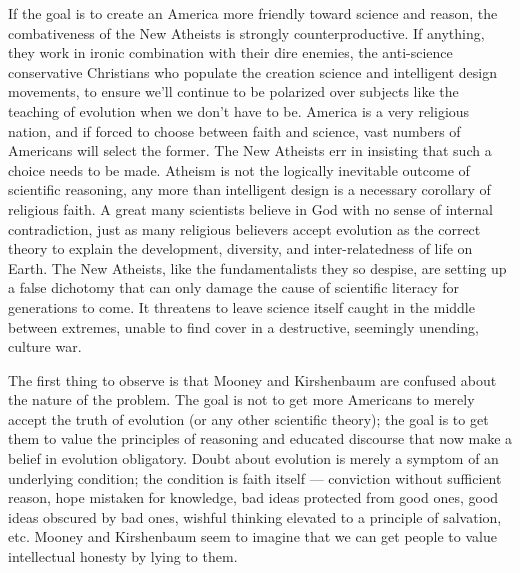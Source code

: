 \documentclass[a4paper,14pt]{extarticle}
\begin{document}
If the goal is to create an America more friendly toward science and reason, the combativeness of the New Atheists is strongly counterproductive.
If anything, they work in ironic combination with their dire enemies, the anti-science conservative Christians who populate the creation science and intelligent design movements, to ensure we’ll continue to be polarized over subjects like the teaching of evolution when we don’t have to be.
America is a very religious nation, and if forced to choose between faith and science, vast numbers of Americans will select the former.
The New Atheists err in insisting that such a choice needs to be made.
Atheism is not the logically inevitable outcome of scientific reasoning, any more than intelligent design is a necessary corollary of religious faith.
A great many scientists believe in God with no sense of internal contradiction, just as many religious believers accept evolution as the correct theory to explain the development, diversity, and inter-relatedness of life on Earth.
The New Atheists, like the fundamentalists they so despise, are setting up a false dichotomy that can only damage the cause of scientific literacy for generations to come.
It threatens to leave science itself caught in the middle between extremes, unable to find cover in a destructive, seemingly unending, culture war.

The first thing to observe is that Mooney and Kirshenbaum are confused about the nature of the problem.
The goal is not to get more Americans to merely accept the truth of evolution (or any other scientific theory);
the goal is to get them to value the principles of reasoning and educated discourse that now make a belief in evolution obligatory.
Doubt about evolution is merely a symptom of an underlying condition;
the condition is faith itself --- conviction without sufficient reason, hope mistaken for knowledge, bad ideas protected from good ones, good ideas obscured by bad ones, wishful thinking elevated to a principle of salvation, etc.
Mooney and Kirshenbaum seem to imagine that we can get people to value intellectual honesty by lying to them.
\end{document}
